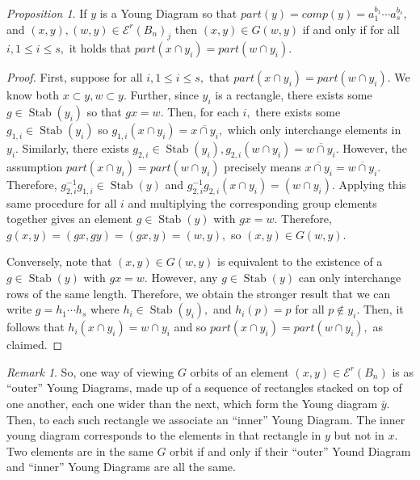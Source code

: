 \documentclass[10 pt]{amsart}
\theoremstyle{plain}
\theoremstyle{definition}
\theoremstyle{remark}
\numberwithin{equation}{section}
\newtheorem{prop}[thm]{Proposition}
\theoremstyle{remark}
\newtheorem{rem}[thm]{Remark}
\def\Stab{\operatorname{Stab}}
\begin{document}
\begin{prop}
\label{prop:wreath_orbits}
If $y$ is a Young Diagram so that $part(y) = comp(y) =a_1^{b_1}\cdots a_s^{b_s}$, and $(x, y), (w, y) \in\mathcal E^r(B_n)_j$ then $(x, y) \in G(w, y)$ if and only if for all $i,1 \leq i \leq s,$ it holds that $part(x\cap y_i) = part(w \cap y_i).$
\end{prop}
\begin{proof}
First, suppose for all $i,1 \leq i \leq s,$ that $part(x\cap y_i) = part(w\cap y_i).$ We know both $x\subset y, w \subset y$. Further, since $y_i$ is a rectangle, there exists some $g \in \Stab(y_i)$ so that $gx = w.$ Then, for each $i,$ there exists some $g_{1,i} \in \Stab(y_i)$ so $g_{1,i}(x \cap y_i)=\overline{x \cap y_i},$ which only interchange elements in $y_i.$ Similarly, there exists $g_{2,i} \in \Stab(y_i),g_{2,i}(w \cap y_i) = \overline{w\cap y_i}.$ However, the assumption $part(x\cap y_i) = part(w\cap y_i)$ precisely means $\overline{x \cap y_i}= \overline{w\cap y_i}.$ Therefore, $g_{2,i}^{-1}g_{1,i} \in \Stab(y)$ and $g_{2,i}^{-1}g_{2,i}(x \cap y_i) = (w \cap y_i).$ Applying this same procedure for all $i$ and multiplying the corresponding group elements together gives an element $g \in \Stab(y)$ with $gx = w.$ Therefore, $g(x, y) = (gx, gy) = (gx, y) = (w, y),$ so $(x, y) \in G(w, y).$

Conversely, note that $(x, y) \in G(w, y)$ is equivalent to the existence of a $g \in \Stab(y)$ with $gx = w.$ However, any $g \in \Stab(y)$ can only interchange rows of the same length. Therefore, we obtain the stronger result that we can write $g = h_1 \cdots h_s$ where $h_i \in \Stab(y_i),$ and $h_i(p) = p$ for all $p \notin y_i.$ Then, it follows that $h_i(x \cap y_i) = w \cap y_i$ and so $part(x\cap y_i) = part(w\cap y_i),$ as claimed.
\end{proof}

\begin{rem}
So, one way of viewing $G$ orbits of an element $(x, y) \in \mathcal E^r(B_n)$ is as ``outer'' Young Diagrams, made up of a sequence of rectangles stacked on top of one another, each one wider than the next, which form the Young diagram $\bar y.$ Then, to each such rectangle we associate an ``inner'' Young Diagram. The inner young diagram corresponds to the elements in that rectangle in $y$ but not in $x.$ Two elements are in the same $G$ orbit if and only if their ``outer'' Yound Diagram and ``inner'' Young Diagrams are all the same.
\end{rem}
\end{document}
